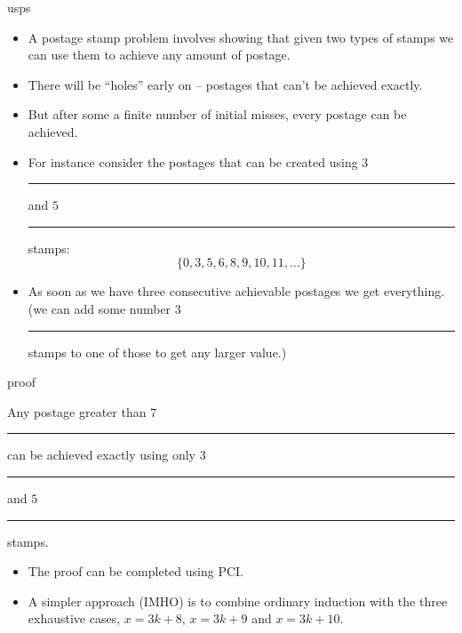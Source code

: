\documentclass[handout,landscape]{beamer}
\begin{document}
\begin{frame}{usps}
\begin{itemize}
\item A postage stamp problem involves showing that given two types of stamps we can use them to achieve any amount of postage. \pause
\item There will be ``holes'' early on -- postages that can't be achieved exactly. \pause
\item But after some a finite number of initial misses, every postage can be achieved. \pause
\item For instance consider the postages that can be created using $3$\textcent\rule{1pt}{0pt} and $5$\textcent\rule{1pt}{0pt} stamps: \pause
\[ \{ 0, 3, 5, 6, 8, 9, 10, 11, \ldots \} \] \pause
\item As soon as we have three consecutive achievable postages we get everything. \pause \newline
(we can add some number $3$\textcent\rule{1pt}{0pt} stamps to one of those to get any larger value.)
\end{itemize}
\end{frame}

\begin{frame}{proof}
\begin{thm*}
Any postage greater than $7$\textcent\rule{1pt}{0pt} can be achieved exactly using only $3$\textcent\rule{1pt}{0pt} and $5$\textcent\rule{1pt}{0pt} stamps.
\end{thm*} \pause
\begin{itemize}
\item The proof can be completed using PCI. \pause
\item A simpler approach (IMHO) is to combine ordinary induction with the three exhaustive cases, $x=3k+8$, $x=3k+9$ and $x=3k+10$.
\end{itemize}

\end{frame}
\end{document}
